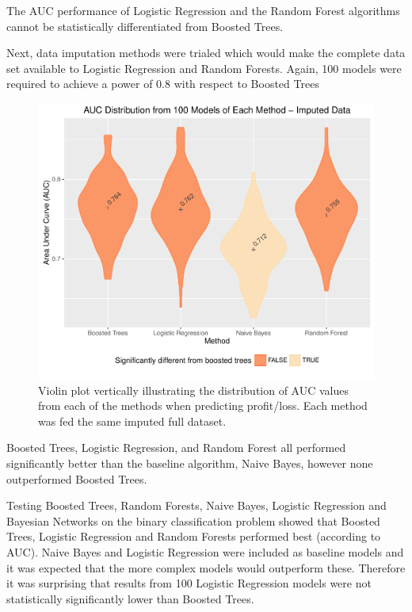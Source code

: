 \documentclass[]{elsarticle} %
\makeatletter
\def\maxwidth{\ifdim\Gin@nat@width>\linewidth\linewidth
\else\Gin@nat@width\fi}
\let\Oldincludegraphics\includegraphics
\renewcommand{\includegraphics}[1]{\Oldincludegraphics[width=\maxwidth]{#1}}
\makeatother
\begin{document}
The AUC performance of Logistic Regression and the Random Forest
algorithms cannot be statistically differentiated from Boosted Trees.

Next, data imputation methods were trialed which would make the complete
data set available to Logistic Regression and Random Forests. Again, 100
models were required to achieve a power of 0.8 with respect to Boosted
Trees

\begin{figure}[htbp]
\centering
\includegraphics{Consulting_Profitability_Paper_files/figure-latex/mice_violin-1.pdf}
\caption{Violin plot vertically illustrating the distribution of AUC
values from each of the methods when predicting profit/loss. Each method
was fed the same imputed full dataset.}
\end{figure}

Boosted Trees, Logistic Regression, and Random Forest all performed
significantly better than the baseline algorithm, Naive Bayes, however
none outperformed Boosted Trees.

Testing Boosted Trees, Random Forests, Naive Bayes, Logistic Regression
and Bayesian Networks on the binary classification problem showed that
Boosted Trees, Logistic Regression and Random Forests performed best
(according to AUC). Naive Bayes and Logistic Regression were included as
baseline models and it was expected that the more complex models would
outperform these. Therefore it was surprising that results from 100
Logistic Regression models were not statistically significantly lower
than Boosted Trees.
\end{document}
